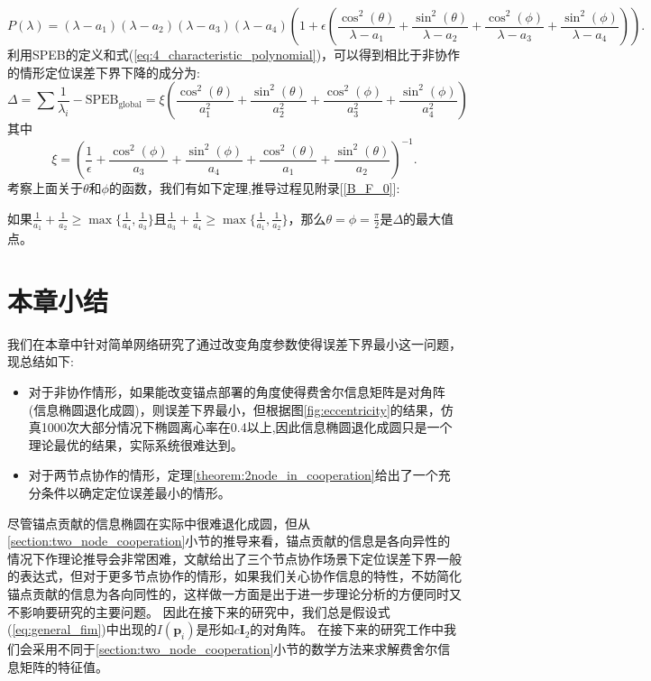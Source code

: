\begin{equation}\label{eq:4_characteristic_polynomial}
P(\lambda)= (\lambda-a_1)(\lambda-a_2)(\lambda-a_3)(\lambda-a_4)(1+\epsilon(\frac{\cos^2(\theta)}{\lambda-a_1}+
 \frac{\sin^2(\theta)}{\lambda-a_2}+\frac{\cos^2(\phi)}{\lambda-a_3}+\frac{\sin^2(\phi)}{\lambda-a_4})).
\end{equation}
利用SPEB的定义和式(\ref{eq:4_characteristic_polynomial})，可以得到相比于非协作的情形定位误差下界下降的成分为:
\begin{equation}
\Delta=\sum \frac{1}{\lambda_i}-\text{SPEB}_{\text{global}}=\xi\left(\frac{\cos^2(\theta)}{a_1^2}+\frac{\sin^2(\theta)}{a_2^2}+\frac{\cos^2(\phi)}{a_3^2}+\frac{\sin^2(\phi)}{a_4^2}\right)
\end{equation}
其中
\begin{equation}
\xi=\left(\frac{1}{\epsilon}+\frac{\cos^2(\phi)}{a_3}+\frac{\sin^2(\phi)}{a_4}+\frac{\cos^2(\theta)}{a_1}+\frac{\sin^2(\theta)}{a_2}\right)^{-1}.
\end{equation}
考察上面关于$\theta$和$\phi$的函数，我们有如下定理,推导过程见附录[\ref{B_F_0}]:
\begin{theorem}\label{theorem:2node_in_cooperation}
如果$\frac{1}{a_1}+\frac{1}{a_2}\geq \max\{\frac{1}{a_4},\frac{1}{a_3}\}$且$\frac{1}{a_3}+\frac{1}{a_4}\geq\max\{\frac{1}{a_1},\frac{1}{a_2}\}$，那么$\theta=\phi=\frac{\pi}{2}$是$\Delta$的最大值点。
\end{theorem}
\section{本章小结}\label{section:conclusion3}
  我们在本章中针对简单网络研究了通过改变角度参数使得误差下界最小这一问题，现总结如下:
  \begin{itemize}
  \item 对于非协作情形，如果能改变锚点部署的角度使得费舍尔信息矩阵是对角阵(信息椭圆退化成圆)，则误差下界最小，但根据图\ref{fig:eccentricity}的结果，仿真1000次大部分情况下椭圆离心率在0.4以上,因此信息椭圆退化成圆只是一个理论最优的结果，实际系统很难达到。
  \item 对于两节点协作的情形，定理\ref{theorem:2node_in_cooperation}给出了一个充分条件以确定定位误差最小的情形。
  \end{itemize}


  尽管锚点贡献的信息椭圆在实际中很难退化成圆，但从\ref{section:two_node_cooperation}小节的推导来看，锚点贡献的信息是各向异性的情况下作理论推导会非常困难，文献\cite{LimitBound3}给出了三个节点协作场景下定位误差下界一般的表达式，但对于更多节点协作的情形，如果我们关心协作信息的特性，不妨简化锚点贡献的信息为各向同性的，这样做一方面是出于进一步理论分析的方便同时又不影响要研究的主要问题。
  因此在接下来的研究中，我们总是假设式(\ref{eq:general_fim})中出现的$I(\bm{p}_i)$是形如$c\bm{I}_2$的对角阵。
  在接下来的研究工作中我们会采用不同于\ref{section:two_node_cooperation}小节的数学方法来求解费舍尔信息矩阵的特征值。

